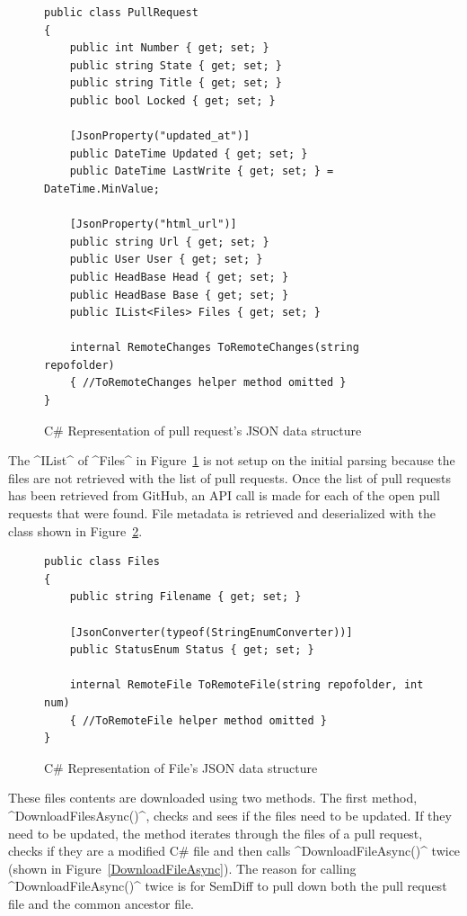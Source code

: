 \documentclass[draftclsnofoot,onecolumn]{IEEEtran}
\begin{document}
\begin{figure}[p]
\centering
\begin{lstlisting}
public class PullRequest
{
 	public int Number { get; set; }
    public string State { get; set; }
    public string Title { get; set; }
    public bool Locked { get; set; }
    
	[JsonProperty("updated_at")]
    public DateTime Updated { get; set; }
    public DateTime LastWrite { get; set; } = DateTime.MinValue;
    
	[JsonProperty("html_url")]
    public string Url { get; set; }
    public User User { get; set; }
    public HeadBase Head { get; set; }
    public HeadBase Base { get; set; }
    public IList<Files> Files { get; set; }
	
    internal RemoteChanges ToRemoteChanges(string repofolder)
    { //ToRemoteChanges helper method omitted }
}
\end{lstlisting}
\caption{C\# Representation of pull request's JSON data structure}
\label{PullRequestCode}
\end{figure}

The ^IList^ of ^Files^ in Figure~\ref{PullRequestCode} is not setup on the 
initial parsing because the files are not retrieved with the list of pull 
requests. Once the list of pull requests has been retrieved from GitHub, an API 
call is made for each of the open pull requests that were found. File metadata 
is retrieved and deserialized with the class shown in Figure~\ref{GitHubFiles}. 

\begin{figure}[p]
\centering
\begin{lstlisting}
public class Files
{
    public string Filename { get; set; }
	
    [JsonConverter(typeof(StringEnumConverter))]
    public StatusEnum Status { get; set; }
	
    internal RemoteFile ToRemoteFile(string repofolder, int num)	
    { //ToRemoteFile helper method omitted }
}
\end{lstlisting}
\caption{ C\# Representation of File's JSON data structure}
\label{GitHubFiles}
\end{figure}

These files contents are downloaded using two methods. The first method, 
^DownloadFilesAsync()^, checks and sees if the files need to be 
updated. If they need to be updated, the method iterates through the files of 
a pull request, checks if they are a modified C\# file and then calls 
^DownloadFileAsync()^ twice (shown in Figure~\ref{DownloadFileAsync}). The 
reason for calling ^DownloadFileAsync()^ twice is for SemDiff to pull down 
both the pull request file and the common ancestor file. 
\end{document}
